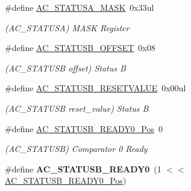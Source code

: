 \begin{DoxyCompactItemize}
\item 
\hypertarget{group___s_a_m_l21___a_c_ga85081ed7ee5f3dd1a625b6e4aff72be5}{}\#define \hyperlink{group___s_a_m_l21___a_c_ga85081ed7ee5f3dd1a625b6e4aff72be5}{A\+C\+\_\+\+S\+T\+A\+T\+U\+S\+A\+\_\+\+M\+A\+S\+K}~0x33ul\label{group___s_a_m_l21___a_c_ga85081ed7ee5f3dd1a625b6e4aff72be5}

\begin{DoxyCompactList}\small\item\em (A\+C\+\_\+\+S\+T\+A\+T\+U\+S\+A) M\+A\+S\+K Register \end{DoxyCompactList}\item 
\hypertarget{group___s_a_m_l21___a_c_ga61e64bbbcd8d070e127dc143ac1badf7}{}\#define \hyperlink{group___s_a_m_l21___a_c_ga61e64bbbcd8d070e127dc143ac1badf7}{A\+C\+\_\+\+S\+T\+A\+T\+U\+S\+B\+\_\+\+O\+F\+F\+S\+E\+T}~0x08\label{group___s_a_m_l21___a_c_ga61e64bbbcd8d070e127dc143ac1badf7}

\begin{DoxyCompactList}\small\item\em (A\+C\+\_\+\+S\+T\+A\+T\+U\+S\+B offset) Status B \end{DoxyCompactList}\item 
\hypertarget{group___s_a_m_l21___a_c_ga35348c0f09306ec32f756769f1c8544b}{}\#define \hyperlink{group___s_a_m_l21___a_c_ga35348c0f09306ec32f756769f1c8544b}{A\+C\+\_\+\+S\+T\+A\+T\+U\+S\+B\+\_\+\+R\+E\+S\+E\+T\+V\+A\+L\+U\+E}~0x00ul\label{group___s_a_m_l21___a_c_ga35348c0f09306ec32f756769f1c8544b}

\begin{DoxyCompactList}\small\item\em (A\+C\+\_\+\+S\+T\+A\+T\+U\+S\+B reset\+\_\+value) Status B \end{DoxyCompactList}\item 
\hypertarget{group___s_a_m_l21___a_c_ga0d6d9dbdd414988aaf79e423983fc8a0}{}\#define \hyperlink{group___s_a_m_l21___a_c_ga0d6d9dbdd414988aaf79e423983fc8a0}{A\+C\+\_\+\+S\+T\+A\+T\+U\+S\+B\+\_\+\+R\+E\+A\+D\+Y0\+\_\+\+Pos}~0\label{group___s_a_m_l21___a_c_ga0d6d9dbdd414988aaf79e423983fc8a0}

\begin{DoxyCompactList}\small\item\em (A\+C\+\_\+\+S\+T\+A\+T\+U\+S\+B) Comparator 0 Ready \end{DoxyCompactList}\item 
\hypertarget{group___s_a_m_l21___a_c_ga0ccf55bc5dabce6c5cef0b655b3e43b7}{}\#define {\bfseries A\+C\+\_\+\+S\+T\+A\+T\+U\+S\+B\+\_\+\+R\+E\+A\+D\+Y0}~(1 $<$$<$ \hyperlink{group___s_a_m_l21___a_c_ga0d6d9dbdd414988aaf79e423983fc8a0}{A\+C\+\_\+\+S\+T\+A\+T\+U\+S\+B\+\_\+\+R\+E\+A\+D\+Y0\+\_\+\+Pos})\label{group___s_a_m_l21___a_c_ga0ccf55bc5dabce6c5cef0b655b3e43b7}


\end{DoxyCompactItemize}

